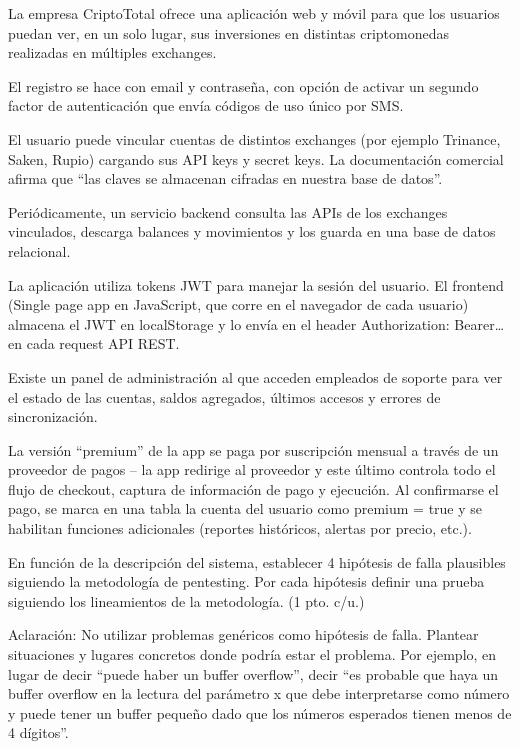 \begin{consigna}
La empresa CriptoTotal ofrece una aplicación web y móvil para que los usuarios puedan ver,
en un solo lugar, sus inversiones en distintas criptomonedas realizadas en múltiples
exchanges.

El registro se hace con email y contraseña, con opción de activar un segundo factor de
autenticación que envía códigos de uso único por SMS.

El usuario puede vincular cuentas de distintos exchanges (por ejemplo Trinance, Saken,
Rupio) cargando sus API keys y secret keys. La documentación comercial afirma que ``las
claves se almacenan cifradas en nuestra base de datos''.

Periódicamente, un servicio backend consulta las APIs de los exchanges vinculados,
descarga balances y movimientos y los guarda en una base de datos relacional.

La aplicación utiliza tokens JWT para manejar la sesión del usuario. El frontend (Single
page app en JavaScript, que corre en el navegador de cada usuario) almacena el JWT en
localStorage y lo envía en el header Authorization: Bearer\ldots en cada request API REST.

Existe un panel de administración al que acceden empleados de soporte para ver el estado de
las cuentas, saldos agregados, últimos accesos y errores de sincronización.

La versión ``premium'' de la app se paga por suscripción mensual a través de un proveedor de
pagos -- la app redirige al proveedor y este último controla todo el flujo de checkout,
captura de información de pago y ejecución. Al confirmarse el pago, se marca en una tabla la
cuenta del usuario como premium = true y se habilitan funciones adicionales (reportes
históricos, alertas por precio, etc.).

En función de la descripción del sistema, establecer 4 hipótesis de falla plausibles
siguiendo la metodología de pentesting. Por cada hipótesis definir una prueba siguiendo los
lineamientos de la metodología. (1 pto. c/u.)

Aclaración: No utilizar problemas genéricos como hipótesis de falla. Plantear situaciones y
lugares concretos donde podría estar el problema. Por ejemplo, en lugar de decir ``puede
haber un buffer overflow'', decir ``es probable que haya un buffer overflow en la lectura del
parámetro x que debe interpretarse como número y puede tener un buffer pequeño dado que los
números esperados tienen menos de 4 dígitos''.
\end{consigna}

